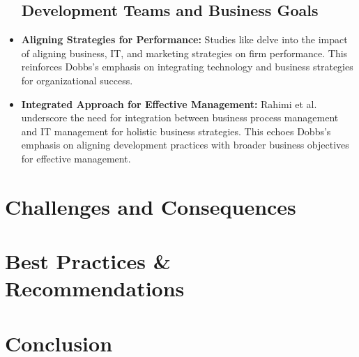 \documentclass[a4Paper]{article}
\begin{document}
\begin{itemize}
    \subsection{Development Teams and Business Goals}
    \item \textbf{Aligning Strategies for Performance:} Studies like \cite{al2020impact} delve into the impact of aligning business, IT, and marketing strategies on firm performance. This reinforces Dobbs's emphasis on integrating technology and business strategies for organizational success.
    \item \textbf{Integrated Approach for Effective Management:} Rahimi et al. \cite{rahimi2016business} underscore the need for integration between business process management and IT management for holistic business strategies. This echoes Dobbs's emphasis on aligning development practices with broader business objectives for effective management.
\end{itemize}
\pagebreak


\section{Challenges and Consequences}
\section{Best Practices \& Recommendations}
\section{Conclusion}
\pagebreak


\end{document}
